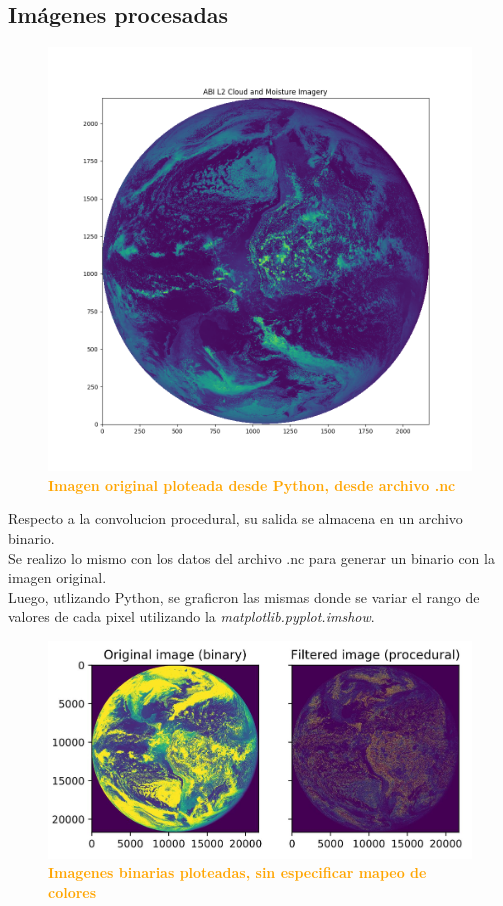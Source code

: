 \documentclass{article}
\begin{document}
\subsection{Imágenes procesadas}
\begin{figure}[H]
    \centering
      \includegraphics[width=1.0\textwidth]{figures/imagen1.png}
       \centering
       \caption{\textbf{\textcolor{Orange}{Imagen original ploteada desde Python, desde archivo .nc}}}
    \end{figure}
    
    Respecto a la convolucion procedural, su salida se almacena en un archivo binario. \\
    Se realizo lo mismo con los datos del archivo .nc para generar un binario con la imagen original.\\
    
     Luego, utlizando Python, se graficron las mismas donde se variar el rango de valores de cada pixel utilizando la \textit{matplotlib.pyplot.imshow}.\\
    
    \begin{figure}[H]
    \centering
      \includegraphics[width=1.0\textwidth]{figures/procedural.jpg}
       \centering
       \caption{\textbf{\textcolor{Orange}{Imagenes binarias ploteadas, sin especificar mapeo de colores}}}
    \end{figure}
\end{document}
